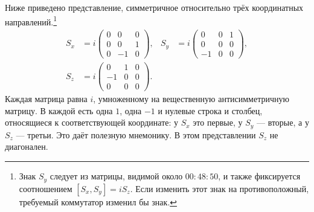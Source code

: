 Ниже приведено представление, симметричное относительно трёх координатных направлений.\footnote{Знак \(S_y\) следует из матрицы, видимой около \(00{:}48{:}50\), и также фиксируется соотношением \([S_x,S_y]=iS_z\). Если изменить этот знак на противоположный, требуемый коммутатор изменил бы знак.}
\begin{equation}
\begin{aligned}
S_x
&=
i
\begin{pmatrix}
0&0&0\\
0&0&1\\
0&-1&0
\end{pmatrix},
&
S_y
&=
i
\begin{pmatrix}
0&0&1\\
0&0&0\\
-1&0&0
\end{pmatrix},\\
S_z
&=
i
\begin{pmatrix}
0&1&0\\
-1&0&0\\
0&0&0
\end{pmatrix}.
\end{aligned}
\end{equation}
Каждая матрица равна \(i\), умноженному на вещественную антисимметричную матрицу. В каждой есть одна \(1\), одна \(-1\) и нулевые строка и столбец, относящиеся к соответствующей координате: у \(S_x\) это первые, у \(S_y\) — вторые, а у \(S_z\) — третьи. Это даёт полезную мнемонику. В этом представлении \(S_z\) не диагонален.

